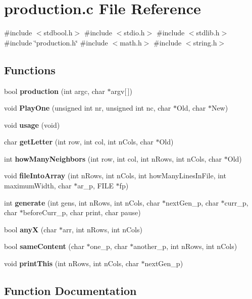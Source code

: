 \section{production.\+c File Reference}
\label{production_8c}
{\ttfamily \#include $<$stdbool.\+h$>$}\newline
{\ttfamily \#include $<$stdio.\+h$>$}\newline
{\ttfamily \#include $<$stdlib.\+h$>$}\newline
{\ttfamily \#include \char`\"{}production.\+h\char`\"{}}\newline
{\ttfamily \#include $<$math.\+h$>$}\newline
{\ttfamily \#include $<$string.\+h$>$}\newline
\subsection*{Functions}
\begin{DoxyCompactItemize}
\item 
bool \textbf{ production} (int argc, char $\ast$argv[$\,$])
\item 
void \textbf{ Play\+One} (unsigned int nr, unsigned int nc, char $\ast$Old, char $\ast$New)
\item 
void \textbf{ usage} (void)
\item 
char \textbf{ get\+Letter} (int row, int col, int n\+Cols, char $\ast$Old)
\item 
int \textbf{ how\+Many\+Neighbors} (int row, int col, int n\+Rows, int n\+Cols, char $\ast$Old)
\item 
void \textbf{ file\+Into\+Array} (int n\+Rows, int n\+Cols, int how\+Many\+Lines\+In\+File, int maximum\+Width, char $\ast$ar\+\_\+p, F\+I\+LE $\ast$fp)
\item 
int \textbf{ generate} (int gens, int n\+Rows, int n\+Cols, char $\ast$next\+Gen\+\_\+p, char $\ast$curr\+\_\+p, char $\ast$before\+Curr\+\_\+p, char print, char pause)
\item 
bool \textbf{ anyX} (char $\ast$arr, int n\+Rows, int n\+Cols)
\item 
bool \textbf{ same\+Content} (char $\ast$one\+\_\+p, char $\ast$another\+\_\+p, int n\+Rows, int n\+Cols)
\item 
void \textbf{ print\+This} (int n\+Rows, int n\+Cols, char $\ast$next\+Gen\+\_\+p)
\end{DoxyCompactItemize}


\subsection{Function Documentation}
\mbox{\label{production_8c_a85f4ceb7eddb00ab9989daf800a74d3f}} 
